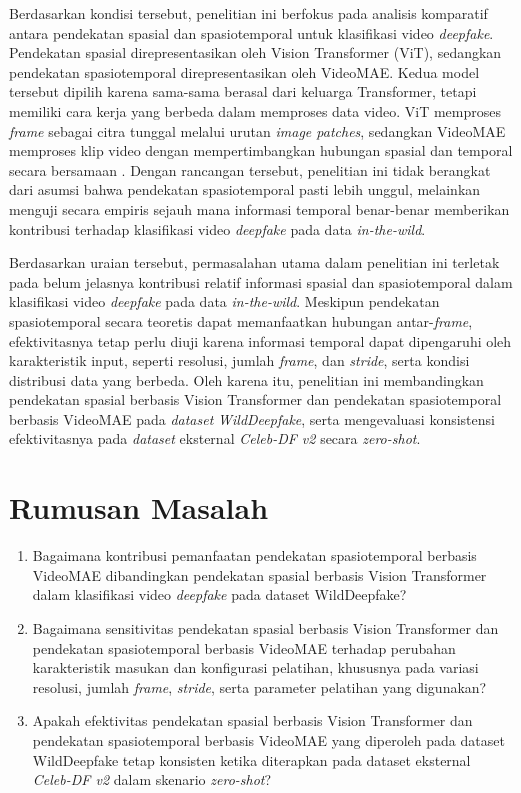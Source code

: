 Berdasarkan kondisi tersebut, penelitian ini berfokus pada analisis komparatif antara pendekatan spasial dan spasiotemporal untuk klasifikasi video \textit{deepfake}. Pendekatan spasial direpresentasikan oleh Vision Transformer (ViT), sedangkan pendekatan spasiotemporal direpresentasikan oleh VideoMAE. Kedua model tersebut dipilih karena sama-sama berasal dari keluarga Transformer, tetapi memiliki cara kerja yang berbeda dalam memproses data video. ViT memproses \textit{frame} sebagai citra tunggal melalui urutan \textit{image patches}, sedangkan VideoMAE memproses klip video dengan mempertimbangkan hubungan spasial dan temporal secara bersamaan \cite{dosovitskiy2021imageworth16x16words}\cite{tong2022videomaemaskedautoencodersdataefficient}. Dengan rancangan tersebut, penelitian ini tidak berangkat dari asumsi bahwa pendekatan spasiotemporal pasti lebih unggul, melainkan menguji secara empiris sejauh mana informasi temporal benar-benar memberikan kontribusi terhadap klasifikasi video \textit{deepfake} pada data \textit{in-the-wild}. \par

Berdasarkan uraian tersebut, permasalahan utama dalam penelitian ini terletak pada belum jelasnya kontribusi relatif informasi spasial dan spasiotemporal dalam klasifikasi video \textit{deepfake} pada data \textit{in-the-wild}. Meskipun pendekatan spasiotemporal secara teoretis dapat memanfaatkan hubungan antar-\textit{frame}, efektivitasnya tetap perlu diuji karena informasi temporal dapat dipengaruhi oleh karakteristik input, seperti resolusi, jumlah \textit{frame}, dan \textit{stride}, serta kondisi distribusi data yang berbeda. Oleh karena itu, penelitian ini membandingkan pendekatan spasial berbasis Vision Transformer dan pendekatan spasiotemporal berbasis VideoMAE pada \textit{dataset} \textit{WildDeepfake}, serta mengevaluasi konsistensi efektivitasnya pada \textit{dataset} eksternal \textit{Celeb-DF v2} secara \textit{zero-shot}. \par

\section{Rumusan Masalah} \label{I.Rumusan Masalah}
\begin{enumerate}[noitemsep]
	\item Bagaimana kontribusi pemanfaatan pendekatan spasiotemporal berbasis VideoMAE dibandingkan pendekatan spasial berbasis Vision Transformer dalam klasifikasi video \textit{deepfake} pada dataset WildDeepfake?
	\item Bagaimana sensitivitas pendekatan spasial berbasis Vision Transformer dan pendekatan spasiotemporal berbasis VideoMAE terhadap perubahan karakteristik masukan dan konfigurasi pelatihan, khususnya pada variasi resolusi, jumlah \textit{frame}, \textit{stride}, serta parameter pelatihan yang digunakan?
	\item Apakah efektivitas pendekatan spasial berbasis Vision Transformer dan pendekatan spasiotemporal berbasis VideoMAE yang diperoleh pada dataset WildDeepfake tetap konsisten ketika diterapkan pada dataset eksternal \textit{Celeb-DF v2} dalam skenario \textit{zero-shot}?
\end{enumerate}

